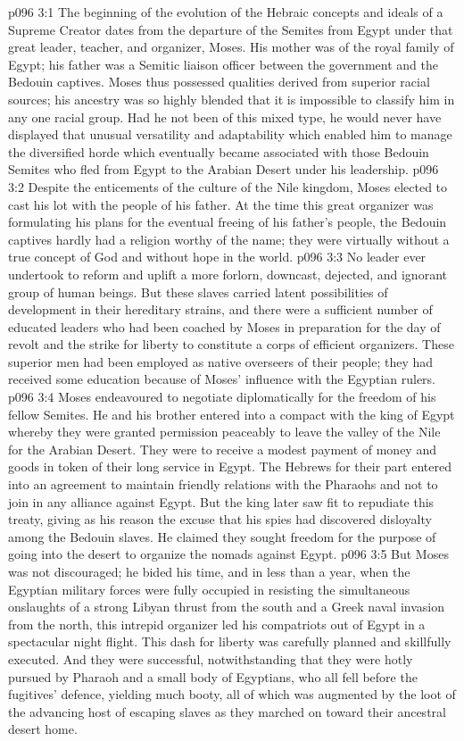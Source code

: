 \vs p096 3:1 The beginning of the evolution of the Hebraic concepts and ideals of a Supreme Creator dates from the departure of the Semites from Egypt under that great leader, teacher, and organizer, Moses. His mother was of the royal family of Egypt; his father was a Semitic liaison officer between the government and the Bedouin captives. Moses thus possessed qualities derived from superior racial sources; his ancestry was so highly blended that it is impossible to classify him in any one racial group. Had he not been of this mixed type, he would never have displayed that unusual versatility and adaptability which enabled him to manage the diversified horde which eventually became associated with those Bedouin Semites who fled from Egypt to the Arabian Desert under his leadership.
\vs p096 3:2 Despite the enticements of the culture of the Nile kingdom, Moses elected to cast his lot with the people of his father. At the time this great organizer was formulating his plans for the eventual freeing of his father’s people, the Bedouin captives hardly had a religion worthy of the name; they were virtually without a true concept of God and without hope in the world.
\vs p096 3:3 \pc No leader ever undertook to reform and uplift a more forlorn, downcast, dejected, and ignorant group of human beings. But these slaves carried latent possibilities of development in their hereditary strains, and there were a sufficient number of educated leaders who had been coached by Moses in preparation for the day of revolt and the strike for liberty to constitute a corps of efficient organizers. These superior men had been employed as native overseers of their people; they had received some education because of Moses’ influence with the Egyptian rulers.
\vs p096 3:4 Moses endeavoured to negotiate diplomatically for the freedom of his fellow Semites. He and his brother entered into a compact with the king of Egypt whereby they were granted permission peaceably to leave the valley of the Nile for the Arabian Desert. They were to receive a modest payment of money and goods in token of their long service in Egypt. The Hebrews for their part entered into an agreement to maintain friendly relations with the Pharaohs and not to join in any alliance against Egypt. But the king later saw fit to repudiate this treaty, giving as his reason the excuse that his spies had discovered disloyalty among the Bedouin slaves. He claimed they sought freedom for the purpose of going into the desert to organize the nomads against Egypt.
\vs p096 3:5 But Moses was not discouraged; he bided his time, and in less than a year, when the Egyptian military forces were fully occupied in resisting the simultaneous onslaughts of a strong Libyan thrust from the south and a Greek naval invasion from the north, this intrepid organizer led his compatriots out of Egypt in a spectacular night flight. This dash for liberty was carefully planned and skillfully executed. And they were successful, notwithstanding that they were hotly pursued by Pharaoh and a small body of Egyptians, who all fell before the fugitives’ defence, yielding much booty, all of which was augmented by the loot of the advancing host of escaping slaves as they marched on toward their ancestral desert home.
